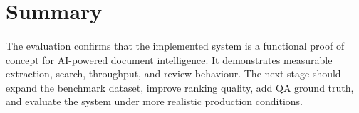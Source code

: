 \section{Summary}
\paragraph{} The evaluation confirms that the implemented system is a functional proof of concept for AI-powered document intelligence. It demonstrates measurable extraction, search, throughput, and review behaviour. The next stage should expand the benchmark dataset, improve ranking quality, add QA ground truth, and evaluate the system under more realistic production conditions.
